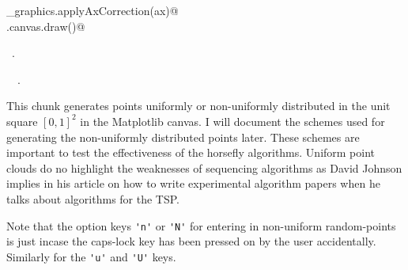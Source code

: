\documentclass[11.5pt]{report}
\begin{document}
\begin{flushleft}
\begin{minipage}{\linewidth}
\begin{list}{}{}
\mbox{}\verb@utils_graphics.applyAxCorrection(ax)@\\
\mbox{}\verb@fig.canvas.draw()@\\
\mbox{}\verb@@{\NWsep}
\end{list}
\vspace{-1.5ex}
\footnotesize
\begin{list}{}{\setlength{\itemsep}{-\parsep}\setlength{\itemindent}{-\leftmargin}}
\item \NWtxtMacroRefIn\ .
\item \NWtxtIdentsUsed\nobreak\  \verb@getTour@\nobreak\ .
\item{}
\end{list}
\end{minipage}\vspace{4ex}
\end{flushleft}

\vspace{-0.8cm}\newchunk This chunk generates points uniformly or non-uniformly distributed in the 
unit square $[0,1]^2$ in the Matplotlib canvas. I will document the schemes used for 
generating the non-uniformly distributed points later. These schemes are important to test the effectiveness of 
the horsefly algorithms. Uniform point clouds do no highlight the weaknesses of 
sequencing algorithms as David Johnson implies in his article on how to write 
experimental algorithm papers when he talks about algorithms for the TSP. 

Note that the option keys \verb|'n'| or \verb|'N'| for entering in non-uniform random-points is just 
incase the caps-lock key has been pressed on by the user accidentally. Similarly for the \verb|'u'|
and \verb|'U'| keys.  
\end{document}
